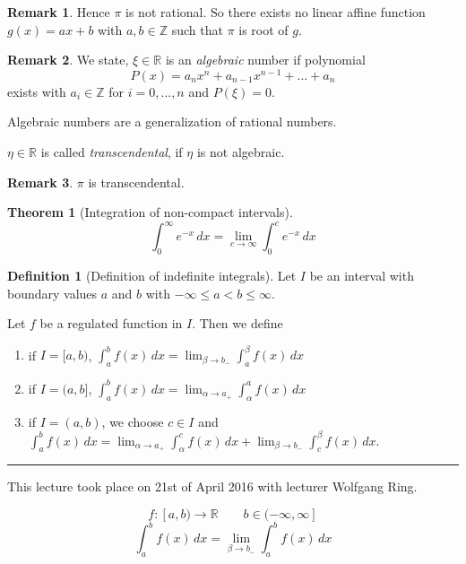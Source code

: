 \documentclass[a4paper,landscape,twocolumn]{article}
\theoremstyle{definition}
\newtheorem{theorem}{Theorem}
\newtheorem{defi}{Definition}
\newtheorem{rem}{Remark}
\newcommand\meta[3]{\hrule{} This #1 took place on #2 with lecturer #3.\par}
\begin{document}
\begin{rem}
  Hence $\pi$ is not rational. So there exists no linear affine function $g(x) = ax + b$
  with $a,b \in \mathbb Z$ such that $\pi$ is root of $g$.
\end{rem}

\begin{rem}
  We state, $\xi \in \mathbb R$ is an \emph{algebraic} number if polynomial
  \[ P(x) = a_n x^n + a_{n-1} x^{n-1} + \ldots + a_n \]
  exists with $a_i \in \mathbb Z$ for $i = 0, \ldots, n$ and $P(\xi) = 0$.

  Algebraic numbers are a generalization of rational numbers.

  $\eta \in \mathbb R$ is called \emph{transcendental}, if $\eta$ is not algebraic.
\end{rem}

\begin{rem}
  $\pi$ is transcendental.
\end{rem}

\begin{theorem}[Integration of non-compact intervals]
  \[ \int_0^\infty e^{-x} \, dx = \lim_{c\to\infty} \int_0^c e^{-x} \, dx \]
\end{theorem}
\begin{defi}[Definition of indefinite integrals]
  Let $I$ be an interval with boundary values $a$ and $b$ with
  $- \infty \leq a < b \leq \infty$.

  Let $f$ be a regulated function in $I$. Then we define
  \begin{enumerate}
    \item if $I = [a,b)$, $\int_a^b f(x) \, dx = \lim_{\beta \to b_-} \int_a^\beta f(x) \, dx$
    \item if $I = (a,b]$, $\int_a^b f(x) \, dx = \lim_{\alpha \to a_+} \int_\alpha^a f(x) \, dx$
    \item if $I = (a,b)$, we choose $c \in I$ and $\int_a^b f(x) \, dx = \lim_{\alpha\to a_+} \int_\alpha^c f(x) \, dx + \lim_{\beta \to b_-} \int_{c}^\beta f(x) \, dx$.
  \end{enumerate}
\end{defi}

\meta{lecture}{21st of April 2016}{Wolfgang Ring}

\[ f: [a,b) \to \mathbb R \qquad b \in (-\infty, \infty] \]
\[ \int_a^b f(x) \, dx = \lim_{\beta \to b_-} \int_a^b f(x) \, dx \]
\end{document}
